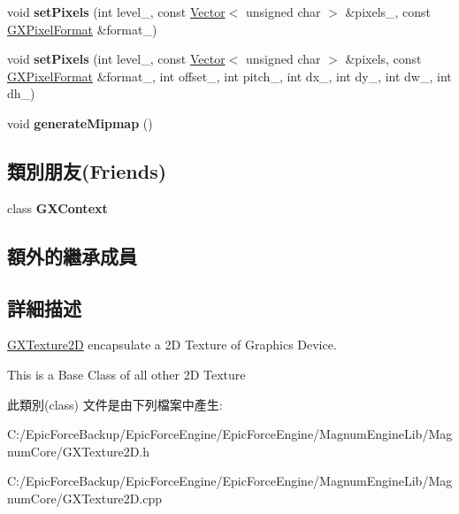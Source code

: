 \begin{DoxyCompactItemize}
\item 
void {\bfseries set\+Pixels} (int level\+\_\+, const \hyperlink{class_magnum_1_1_vector}{Vector}$<$ unsigned char $>$ \&pixels\+\_\+, const \hyperlink{class_magnum_1_1_g_x_pixel_format}{G\+X\+Pixel\+Format} \&format\+\_\+)\hypertarget{class_magnum_1_1_g_x_texture2_d_ad68cc89191504fd871cb42ff62e8f742}{}\label{class_magnum_1_1_g_x_texture2_d_ad68cc89191504fd871cb42ff62e8f742}

\item 
void {\bfseries set\+Pixels} (int level\+\_\+, const \hyperlink{class_magnum_1_1_vector}{Vector}$<$ unsigned char $>$ \&pixels, const \hyperlink{class_magnum_1_1_g_x_pixel_format}{G\+X\+Pixel\+Format} \&format\+\_\+, int offset\+\_\+, int pitch\+\_\+, int dx\+\_\+, int dy\+\_\+, int dw\+\_\+, int dh\+\_\+)\hypertarget{class_magnum_1_1_g_x_texture2_d_a82188075c62cc82f781a7a79239cabca}{}\label{class_magnum_1_1_g_x_texture2_d_a82188075c62cc82f781a7a79239cabca}

\item 
void {\bfseries generate\+Mipmap} ()\hypertarget{class_magnum_1_1_g_x_texture2_d_a8cebc2f0b6d211cafc9e3c66895138d0}{}\label{class_magnum_1_1_g_x_texture2_d_a8cebc2f0b6d211cafc9e3c66895138d0}

\end{DoxyCompactItemize}
\subsection*{類別朋友(Friends)}
\begin{DoxyCompactItemize}
\item 
class {\bfseries G\+X\+Context}\hypertarget{class_magnum_1_1_g_x_texture2_d_a2c36d7f8865080802bbad88cd73d871c}{}\label{class_magnum_1_1_g_x_texture2_d_a2c36d7f8865080802bbad88cd73d871c}

\end{DoxyCompactItemize}
\subsection*{額外的繼承成員}


\subsection{詳細描述}
\hyperlink{class_magnum_1_1_g_x_texture2_d}{G\+X\+Texture2D} encapsulate a 2D Texture of Graphics Device. 

This is a Base Class of all other 2D Texture 

此類別(class) 文件是由下列檔案中產生\+:\begin{DoxyCompactItemize}
\item 
C\+:/\+Epic\+Force\+Backup/\+Epic\+Force\+Engine/\+Epic\+Force\+Engine/\+Magnum\+Engine\+Lib/\+Magnum\+Core/G\+X\+Texture2\+D.\+h\item 
C\+:/\+Epic\+Force\+Backup/\+Epic\+Force\+Engine/\+Epic\+Force\+Engine/\+Magnum\+Engine\+Lib/\+Magnum\+Core/G\+X\+Texture2\+D.\+cpp\end{DoxyCompactItemize}
